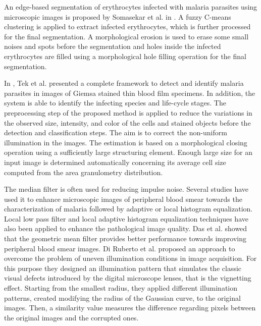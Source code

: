 An edge-based segmentation of erythrocytes infected with malaria parasites using microscopic images is proposed by Somasekar et al. in \cite{Somasekar2015}.  A fuzzy C-means clustering is applied to extract infected erythrocytes, which is further processed for the final segmentation. A morphological erosion is used to erase some small noises and spots before the segmentation and holes inside the infected erythrocytes are filled using a morphological hole filling operation for the final segmentation.

In \cite{Tek2010}, Tek et al. presented a complete framework to detect and identify malaria parasites in images of Giemsa stained thin blood film specimens. In addition, the system is able to identify the infecting species and life-cycle stages.
The preprocessing step of the proposed method is applied to reduce the variations in the observed size, intensity, and color of the cells and stained objects before the detection and classification steps. The aim is to correct the non-uniform illumination in the images. The estimation is based on a morphological closing operation using a sufficiently large structuring element. Enough large size for an input image is determined automatically concerning its average cell size computed from the area granulometry distribution.

The median filter is often used for reducing impulse noise. Several studies have used it to enhance microscopic images of peripheral blood smear towards the characterization of malaria followed by adaptive or local histogram equalization. Local low pass filter and local adaptive histogram equalization techniques have also been applied to enhance the pathological image quality. Das et al. \cite{Das2015} showed that the geometric mean filter provides better performance towards improving peripheral blood smear images. Di Ruberto et al. \cite{DiRuberto2016} proposed an approach to overcome the problem of uneven illumination conditions in image acquisition. For this purpose they designed an illumination pattern that simulates the classic visual defects introduced by the digital microscope lenses, that is the vignetting effect. Starting from the smallest radius, they applied different illumination patterns, created modifying the radius of the Gaussian curve, to the original images. Then, a similarity value measures the difference regarding pixels between the original images and the corrupted ones.

